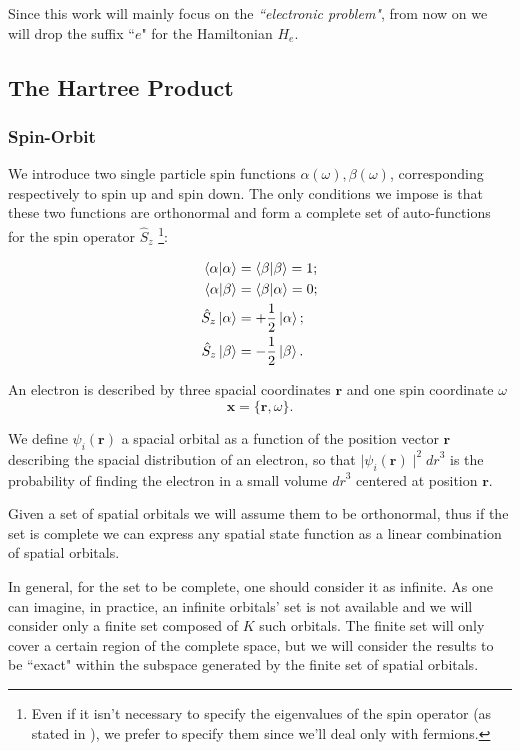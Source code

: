 \documentclass[a4paper,12pt]{article}
\begin{document}
Since this work will mainly focus on the \textit{``electronic problem"}, from now on we will drop the suffix ``$e$" for the Hamiltonian $H_{e}$.

\subsection{The Hartree Product}
\subsubsection{Spin-Orbit}
We introduce two single particle spin functions  $\alpha(\omega), \beta(\omega)$, corresponding respectively to spin up and spin down.
The only conditions we impose is that these two functions are orthonormal and form a complete set of auto-functions for the spin operator $\hat{S}_z$ \footnote{Even if it isn't necessary to specify the eigenvalues of the spin operator (as stated in \cite{Attila}), we prefer to specify them since we'll deal only with fermions. }:

\begin{align*}
	\bra{\alpha}\ket{\alpha} & = \bra{\beta}\ket{\beta} = 1; \\
	\bra{\alpha}\ket{\beta} & = \bra{\beta}\ket{\alpha} = 0; \\
	\hat{S}_{z} \ket{\alpha} & = + \frac{1}{2} \ket{\alpha}; \\
	\hat{S}_{z} \ket{\beta} & = - \frac{1}{2} \ket{\beta}. \\
\end{align*}

An electron is described by three spacial coordinates $\mathbf{r}$ and one spin coordinate $\omega$
\begin{equation}
	\mathbf{x} = \{\mathbf{r},\omega\}.
\end{equation}

We define $\psi_i(\mathbf{r})$ a spacial orbital as a function of the position vector $\mathbf{r}$ describing the spacial distribution of an electron, so that $\mid\psi_i(\mathbf{r})\mid^2 {dr}^3$ is the probability of finding the electron in a small volume ${dr}^3$ centered at position $\mathbf{r}$.

Given a set of spatial orbitals we will assume them to be orthonormal, thus if the set is complete we can express any spatial state function as a linear combination of spatial orbitals.

In general, for the set to be complete, one should consider it as infinite. As one can imagine, in practice, an infinite orbitals' set is not available and we will consider only a finite set composed of $K$ such orbitals. The finite set will only cover a certain region of the complete space, but we will consider the results to be ``exact" within the subspace generated by the finite set of spatial orbitals.
\end{document}
